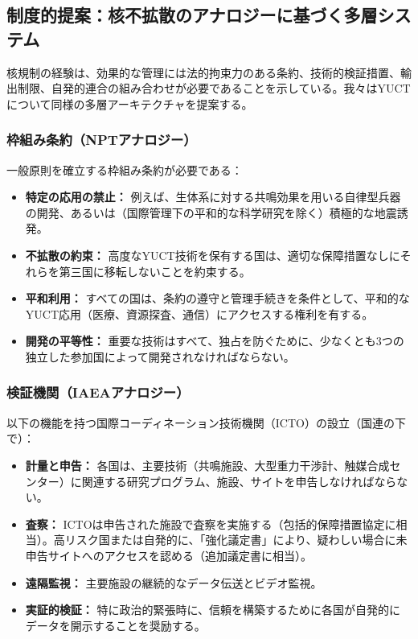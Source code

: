 \documentclass[12pt,a4paper]{article}
\theoremstyle{remark}
\begin{document}
	\subsection{制度的提案：核不拡散のアナロジーに基づく多層システム}
	\label{subsec:institutions}
	
	核規制の経験は、効果的な管理には法的拘束力のある条約、技術的検証措置、輸出制限、自発的連合の組み合わせが必要であることを示している。我々はYUCTについて同様の多層アーキテクチャを提案する。
	
	\subsubsection{枠組み条約（NPTアナロジー）}
	
	一般原則を確立する枠組み条約が必要である：
	\begin{itemize}
		\item \textbf{特定の応用の禁止：} 例えば、生体系に対する共鳴効果を用いる自律型兵器の開発、あるいは（国際管理下の平和的な科学研究を除く）積極的な地震誘発。
		\item \textbf{不拡散の約束：} 高度なYUCT技術を保有する国は、適切な保障措置なしにそれらを第三国に移転しないことを約束する。
		\item \textbf{平和利用：} すべての国は、条約の遵守と管理手続きを条件として、平和的なYUCT応用（医療、資源探査、通信）にアクセスする権利を有する。
		\item \textbf{開発の平等性：} 重要な技術はすべて、独占を防ぐために、少なくとも3つの独立した参加国によって開発されなければならない。
	\end{itemize}
	
	\subsubsection{検証機関（IAEAアナロジー）}
	
	以下の機能を持つ国際コーディネーション技術機関（ICTO）の設立（国連の下で）：
	\begin{itemize}
		\item \textbf{計量と申告：} 各国は、主要技術（共鳴施設、大型重力干渉計、触媒合成センター）に関連する研究プログラム、施設、サイトを申告しなければならない。
		\item \textbf{査察：} ICTOは申告された施設で査察を実施する（包括的保障措置協定に相当）。高リスク国または自発的に、「強化議定書」により、疑わしい場合に未申告サイトへのアクセスを認める（追加議定書に相当）。
		\item \textbf{遠隔監視：} 主要施設の継続的なデータ伝送とビデオ監視。
		\item \textbf{実証的検証：} 特に政治的緊張時に、信頼を構築するために各国が自発的にデータを開示することを奨励する。
	\end{itemize}
	
\end{document}
